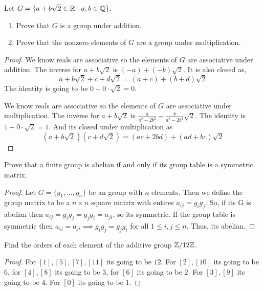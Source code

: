\begin{problem}
    Let $G = \{a + b\sqrt{2} \in \mathbb{R} \mid a, b \in \mathbb{Q}\}$.
    \begin{enumerate}
        \item Prove that $G$ is a group under addition.
        \item Prove that the nonzero elements of $G$ are a group under multiplication. 
    \end{enumerate}
\end{problem}

\begin{proof}
    We know reals are associative so the elements of $G$ are associative under addition. The inverse for $a+b \sqrt{2}$ is $(-a)+(-b)\sqrt{2}$.
    It is also closed as,
    \[ a+b\sqrt{2} + c + d\sqrt{2} = (a+c)+(b+d)\sqrt{2} \]
    The identity is going to  be $0+0\cdot \sqrt{2}=0$.

    We know reals are associative so the elements of $G$ are associative under multiplication. 
    The inverse for $a+b \sqrt{2}$ is $\displaystyle \frac{a}{a^2-2b^2} - \frac{b}{a^2-2b^2} \sqrt{2}$.
    The identity is $1+0 \cdot \sqrt{2}=1$. And its closed under multiplication as 
    \[ (a+b\sqrt{2})(c+d\sqrt{2})= (ac+2bd)+(ad+bc)\sqrt{2} \]
\end{proof}

\begin{problem}
    Prove that a finite group is abelian if and only if its group table is a symmetric matrix.
\end{problem}

\begin{proof}
    Let $G = \{g_1,\ldots,g_n\}$ be an group with $n$ elements. Then we define the group matrix to be a $n \times n$ square matrix 
    with entires $a_{ij} = g_i g_j$. So, if its G is abelian then $a_{ij}=g_i g_j = g_j g_i = a_{ji}$, so its symmetric. 
    If the group table is symmetric then $a_{ij}=a_{ji} \implies g_ig_j = g_jg_i$ for all $1 \le i,j \le n$. Thus, its abelian. 
\end{proof}

\begin{problem}
    Find the orders of each element of the additive group $\mathbb{Z}/12\mathbb{Z}$.
\end{problem}

\begin{proof}
    For $[1],[5],[7],[11]$ its going to be $12$. For $[2],[10]$ its going to be $6$, for $[4],[8]$ its going to be $3$,
    for $[6]$ its going to be $2$. For $[3],[9]$ its going to be $4$. For $[0]$ its going to be $1$.
\end{proof}

